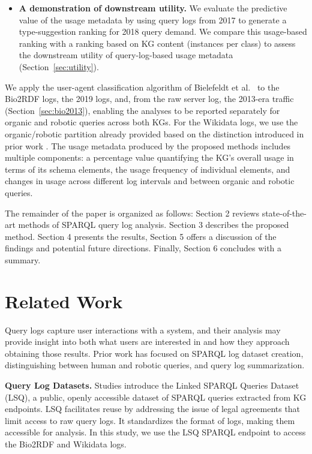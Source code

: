 \documentclass[sw]{iosart2x}
\begin{document}
\begin{itemize}
\item \textbf{A demonstration of downstream utility.} We evaluate the predictive value of the usage metadata by using query logs from 2017 to generate a type-suggestion ranking for 2018 query demand. We compare this usage-based ranking with a ranking based on KG content (instances per class) to assess the downstream utility of query-log-based usage metadata (Section~\ref{sec:utility}).

\end{itemize}
We apply the user-agent classification algorithm of Bielefeldt et al.\ \cite{bielefeldt2018practical} to the Bio2RDF logs, the 2019 logs, and, from the raw server log, the 2013-era traffic (Section~\ref{sec:bio2013}), enabling the analyses to be reported separately for organic and robotic queries across both KGs. For the Wikidata logs, we use the organic/robotic partition already provided based on the distinction introduced in prior work \cite{malyshev2018getting,bielefeldt2018practical}. The usage metadata produced by the proposed methods includes multiple components: a percentage value quantifying the KG's overall usage in terms of its schema elements, the usage frequency of individual elements, and changes in usage across different log intervals and between organic and robotic queries.

The remainder of the paper is organized as follows: Section 2 reviews state-of-the-art methods of SPARQL query log analysis. Section 3 describes the proposed method. Section 4 presents the results, Section 5 offers a discussion of the findings and potential future directions. Finally, Section 6 concludes with a summary.

\section{Related Work}\label{s2}

Query logs capture user interactions with a system, and their analysis may provide insight into both what users are interested in and how they approach obtaining those results.  Prior work has focused on SPARQL log dataset creation, distinguishing between human and robotic queries, and query log summarization.

\textbf{Query Log Datasets.}
Studies \cite{saleem2015lsq,stadler2024lsq} introduce the Linked SPARQL Queries Dataset (LSQ), a public, openly accessible dataset of SPARQL queries extracted from KG endpoints. LSQ facilitates reuse by addressing the issue of legal agreements that limit access to raw query logs. It standardizes the format of logs, making them accessible for analysis. In this study, we use the LSQ SPARQL endpoint to access the Bio2RDF and Wikidata logs.
\end{document}
